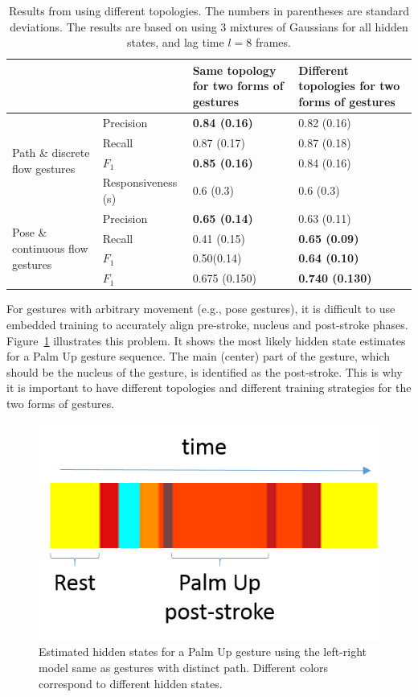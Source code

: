 \begin{table}[tbh]
\centering
\begin{tabular}{|l|l|p{3cm}|p{3cm}|}
\hline
& & \textbf{Same topology for two forms of gestures} & \textbf{Different
topologies for two forms of gestures} \\
\hline
\multirow{4}{4cm}{Path \& discrete flow gestures} 
& Precision & \textbf{0.84 (0.16)} & 0.82 (0.16) \\
\cline{2-4}
& Recall & 0.87 (0.17) & 0.87 (0.18)\\
\cline{2-4}
& $F_1$ & \textbf{0.85 (0.16)} &  0.84 (0.16)\\
\cline{2-4}
& Responsiveness (s) & 0.6 (0.3) & 0.6 (0.3) \\
\hline
\multirow{4}{4.5cm}{Pose \& continuous flow gestures}
& Precision & \textbf{0.65 (0.14)} & 0.63 (0.11) \\
\cline{2-4}
& Recall & 0.41 (0.15) & \textbf{0.65 (0.09)} \\
\cline{2-4}
& $F_1$ & 0.50(0.14) & \textbf{0.64 (0.10)} \\
\hline
\textbf{Average} & $F_1$ & 0.675 (0.150) & \textbf{0.740 (0.130)} \\
\hline
\end{tabular}
\caption{Results from using different topologies. The numbers in parentheses are
standard deviations. The results are based on using 3 mixtures of Gaussians
for all hidden states, and lag time
$l = 8$ frames.}
\label{tab:result}
\end{table}

For gestures with arbitrary movement (e.g., pose gestures), it is difficult to
use embedded training to accurately align pre-stroke, nucleus and post-stroke phases.
Figure~\ref{fig:palm-hidden} illustrates this problem. It shows the most
likely hidden state estimates for a Palm Up gesture sequence. The main (center)
part of the gesture, which should be the nucleus of the gesture, is identified
as the post-stroke. This is why it is important to have different topologies and
different training strategies for the two forms of gestures.

\begin{figure}[tbh]
\centering
\includegraphics[width=0.3\linewidth]{figures/palm_hidden_label.png}
\caption{Estimated hidden states for a Palm Up gesture using the
left-right model same as gestures with distinct path. Different colors correspond to
different hidden states.}
\label{fig:palm-hidden}
\end{figure}

